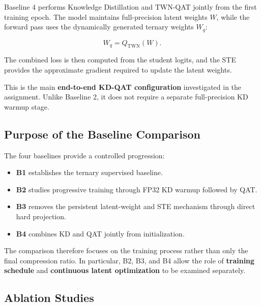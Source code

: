 \documentclass[conference]{IEEEtran}
\begin{document}
Baseline 4 performs Knowledge Distillation and TWN-QAT jointly from the
first training epoch. The model maintains full-precision latent
weights $W$, while the forward pass uses the dynamically generated
ternary weights $W_q$:

\begin{equation}
W_q = Q_{\mathrm{TWN}}(W).
\end{equation}

The combined loss is then computed from the student logits, and the
STE provides the approximate gradient required to update the latent
weights.

This is the main \textbf{end-to-end KD-QAT configuration} investigated
in the assignment. Unlike Baseline 2, it does not require a separate
full-precision KD warmup stage.


\subsection{Purpose of the Baseline Comparison}

The four baselines provide a controlled progression:

\begin{itemize}
    \item \textbf{B1} establishes the ternary supervised baseline.
    \item \textbf{B2} studies progressive training through FP32 KD
    warmup followed by QAT.
    \item \textbf{B3} removes the persistent latent-weight and STE
    mechanism through direct hard projection.
    \item \textbf{B4} combines KD and QAT jointly from initialization.
\end{itemize}

The comparison therefore focuses on the training process rather than
only the final compression ratio. In particular, B2, B3, and B4 allow
the role of \textbf{training schedule} and
\textbf{continuous latent optimization} to be examined separately.


\subsection{Ablation Studies}
\end{document}
